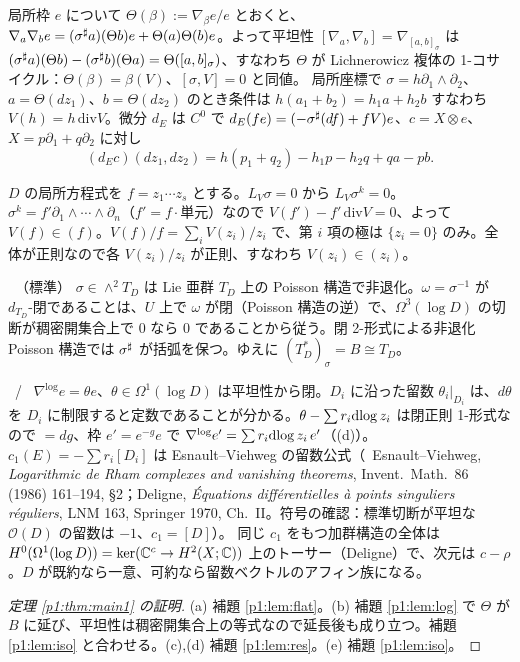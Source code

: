\begin{lem}\tP\label{p1:lem:flat}
局所枠 $e$ について $\Theta(\beta):=\nabla_\beta e/e$ とおくと、$\nabla_a\nabla_be=(\sigma^\sharp a)(\Theta b)e+\Theta(a)\Theta(b)e$。よって平坦性 $[\nabla_a,\nabla_b]=\nabla_{[a,b]_\sigma}$ は
$(\sigma^\sharp a)(\Theta b)-(\sigma^\sharp b)(\Theta a)=\Theta([a,b]_\sigma)$、すなわち $\Theta$ が Lichnerowicz 複体の 1-コサイクル：$\Theta(\beta)=\beta(V)$、$[\sigma,V]=0$ と同値。
局所座標で $\sigma=h\partial_1\wedge\partial_2$、$a=\Theta(dz_1)$、$b=\Theta(dz_2)$ のとき条件は $h(a_1+b_2)=h_1a+h_2b$ すなわち $V(h)=h\,\mathrm{div}V$。微分 $d_E$ は $C^0$ で $d_E(fe)=(-\sigma^\sharp(df)+fV)e$、$c=X\otimes e$、$X=p\partial_1+q\partial_2$ に対し
\[(d_Ec)(dz_1,dz_2)=h(p_1+q_2)-h_1p-h_2q+qa-pb.\]
\end{lem}
\begin{lem}[$V$ は対数的]\tP\label{p1:lem:log}
$D$ の局所方程式を $f=z_1\cdots z_s$ とする。$L_V\sigma=0$ から $L_V\sigma^k=0$。$\sigma^k=f'\partial_1\wedge\cdots\wedge\partial_n$（$f'=f\cdot$単元）なので $V(f')-f'\,\mathrm{div}V=0$、よって $V(f)\in(f)$。$V(f)/f=\sum_iV(z_i)/z_i$ で、第 $i$ 項の極は $\{z_i=0\}$ のみ。全体が正則なので各 $V(z_i)/z_i$ が正則、すなわち $V(z_i)\in(z_i)$。
\end{lem}
\begin{lem}\tP\ （標準）\label{p1:lem:iso}
$\sigma\in\wedge^2T_D$ は Lie 亜群 $T_D$ 上の Poisson 構造で非退化。$\omega=\sigma^{-1}$ が $d_{T_D}$-閉であることは、$U$ 上で $\omega$ が閉（Poisson 構造の逆）で、$\Omega^3(\log D)$ の切断が稠密開集合上で 0 なら 0 であることから従う。閉 2-形式による非退化 Poisson 構造では $\sigma^\sharp$ が括弧を保つ。ゆえに $(T_D^*)_\sigma=B\cong T_D$。
\end{lem}
\begin{lem}[留数・局所標準形・$c_1$]\tP\ /\ \tC\label{p1:lem:res}
$\nabla^{\log}e=\theta e$、$\theta\in\Omega^1(\log D)$ は平坦性から閉。$D_i$ に沿った留数 $\theta_i|_{D_i}$ は、$d\theta$ を $D_i$ に制限すると定数であることが分かる。$\theta-\sum r_i\mathrm{dlog}\, z_i$ は閉正則 1-形式なので $=dg$、枠 $e'=e^{-g}e$ で $\nabla^{\log}e'=\sum r_i\mathrm{dlog}\, z_i\,e'$（(d)）。$c_1(E)=-\sum r_i[D_i]$ は Esnault--Viehweg の留数公式（\tC\ Esnault--Viehweg, \emph{Logarithmic de Rham complexes and vanishing theorems}, Invent.\ Math.\ 86 (1986) 161--194, \S2；Deligne, \emph{\'Equations diff\'erentielles \`a points singuliers r\'eguliers}, LNM 163, Springer 1970, Ch.\ II。符号の確認：標準切断が平坦な $\mathcal O(D)$ の留数は $-1$、$c_1=[D]$）。
同じ $c_1$ をもつ加群構造の全体は $H^0(\Omega^1(\log D))=\ker(\mathbb C^c\to H^2(X;\mathbb C))$ 上のトーサー（Deligne）で、次元は $c-\rho$。$D$ が既約なら一意、可約なら留数ベクトルのアフィン族になる。
\end{lem}
\begin{proof}[定理 \ref{p1:thm:main1} の証明]
(a) 補題 \ref{p1:lem:flat}。(b) 補題 \ref{p1:lem:log} で $\Theta$ が $B$ に延び、平坦性は稠密開集合上の等式なので延長後も成り立つ。補題 \ref{p1:lem:iso} と合わせる。(c),(d) 補題 \ref{p1:lem:res}。(e) 補題 \ref{p1:lem:iso}。
\end{proof}

